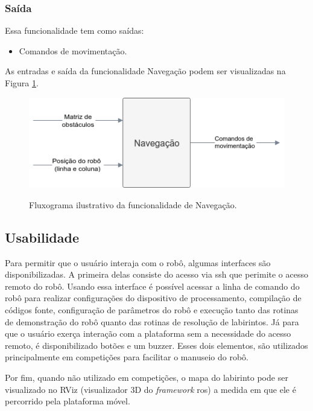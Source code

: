 \subsubsection{Saída}
Essa funcionalidade tem como saídas:
\begin{itemize}
	\item Comandos de movimentação.
\end{itemize}

As entradas e saída da funcionalidade Navegação podem ser visualizadas na Figura \ref{fig:especificacao_funcional_navegacao}.

\begin{figure}[H]
	\centering
	\caption{Fluxograma ilustrativo da funcionalidade de Navegação.}
	\includegraphics[width=1\textwidth]
	{Figures/especificacao_funcional_navegacao}
	\label{fig:especificacao_funcional_navegacao}
\end{figure}

\subsection{Usabilidade}
\label{ssec:funcionalidade_usabilidade} 
Para permitir que o usuário interaja com o robô, algumas interfaces são disponibilizadas. A primeira delas consiste do acesso via \gls*{ssh} que perimite o acesso remoto do robô. Usando essa interface é possível acessar a linha de comando do robô para realizar configurações do dispositivo de processamento, compilação de códigos fonte, configuração de parâmetros do robô e execução tanto das rotinas de demonstração do robô quanto das rotinas de resolução de labirintos. Já para que o usuário exerça interação com a plataforma sem a necessidade do acesso remoto, é disponibilizado botões e um buzzer. Esses dois elementos, são utilizados principalmente em competições para facilitar o manuseio do robô.
 
Por fim, quando não utilizado em competições, o mapa do labirinto pode ser visualizado no RViz (visualizador 3D do \textit{framework} \gls*{ros}) a medida em que ele é percorrido pela plataforma móvel.


